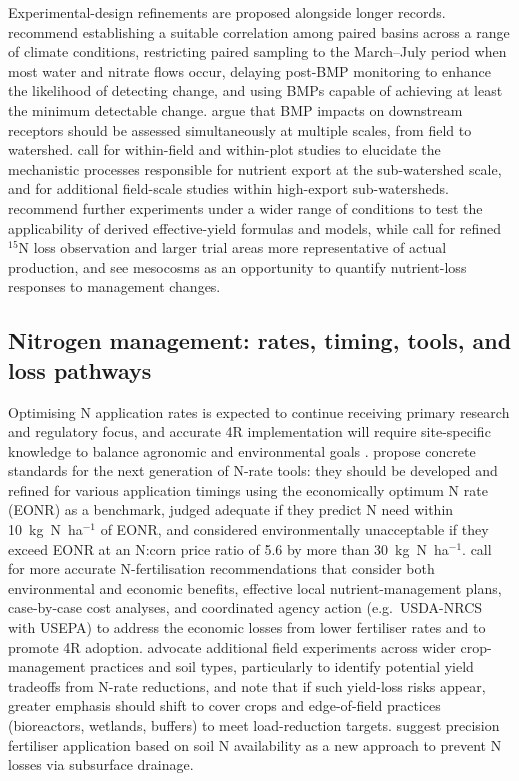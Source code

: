 \documentclass[11pt]{article}
\begin{document}
Experimental-design refinements are proposed alongside longer records. \textcite{Schilling2013} recommend establishing a suitable correlation among paired basins across a range of climate conditions, restricting paired sampling to the March--July period when most water and nitrate flows occur, delaying post-BMP monitoring to enhance the likelihood of detecting change, and using BMPs capable of achieving at least the minimum detectable change. \textcite{Sunohara2016} argue that BMP impacts on downstream receptors should be assessed simultaneously at multiple scales, from field to watershed. \textcite{Irvine2019} call for within-field and within-plot studies to elucidate the mechanistic processes responsible for nutrient export at the sub-watershed scale, and for additional field-scale studies within high-export sub-watersheds. \textcite{Xin2016c} recommend further experiments under a wider range of conditions to test the applicability of derived effective-yield formulas and models, while \textcite{Xiong2025} call for refined $^{15}$N loss observation and larger trial areas more representative of actual production, and \textcite{Loper2024} see mesocosms as an opportunity to quantify nutrient-loss responses to management changes.

\subsection{Nitrogen management: rates, timing, tools, and loss pathways}

Optimising N application rates is expected to continue receiving primary research and regulatory focus, and accurate 4R implementation will require site-specific knowledge to balance agronomic and environmental goals \parencite{Christianson2015b}. \textcite{Bandura2025} propose concrete standards for the next generation of N-rate tools: they should be developed and refined for various application timings using the economically optimum N rate (EONR) as a benchmark, judged adequate if they predict N need within 10~kg~N~ha$^{-1}$ of EONR, and considered environmentally unacceptable if they exceed EONR at an N:corn price ratio of 5.6 by more than 30~kg~N~ha$^{-1}$. \textcite{Liu2021} call for more accurate N-fertilisation recommendations that consider both environmental and economic benefits, effective local nutrient-management plans, case-by-case cost analyses, and coordinated agency action (e.g.\ USDA-NRCS with USEPA) to address the economic losses from lower fertiliser rates and to promote 4R adoption. \textcite{Banger2018} advocate additional field experiments across wider crop-management practices and soil types, particularly to identify potential yield tradeoffs from N-rate reductions, and note that if such yield-loss risks appear, greater emphasis should shift to cover crops and edge-of-field practices (bioreactors, wetlands, buffers) to meet load-reduction targets. \textcite{Gupta2023} suggest precision fertiliser application based on soil N availability as a new approach to prevent N losses via subsurface drainage.
\end{document}
